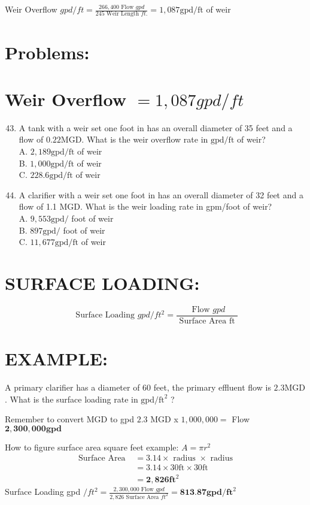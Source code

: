 \begin{enumerate}
Weir Overflow $g p d / f t=\frac{266,400 \text { Flow } g p d}{245 \text { Weir Length } f t .}=1,087 \mathrm{gpd} / \mathrm{ft}$ of weir

\section{Problems:}
\section{Weir Overflow $=1,087 g p d / f t$}
\begin{enumerate}
  \setcounter{enumi}{42}
  \item A tank with a weir set one foot in has an overall diameter of 35 feet and a flow of $0.22 \mathrm{MGD}$. What is the weir overflow rate in $\mathrm{gpd} / \mathrm{ft}$ of weir?\\
A. $2,189 \mathrm{gpd} / \mathrm{ft}$ of weir\\
B. $1,000 \mathrm{gpd} / \mathrm{ft}$ of weir\\
C. $228.6 \mathrm{gpd} / \mathrm{ft}$ of weir

  \item A clarifier with a weir set one foot in has an overall diameter of 32 feet and a flow of 1.1 MGD. What is the weir loading rate in gpm/foot of weir?\\
A. $9,553 \mathrm{gpd} /$ foot of weir\\
B. $897 \mathrm{gpd} /$ foot of weir\\
C. $11,677 \mathrm{gpd} / \mathrm{ft}$ of weir

\end{enumerate}
\section{SURFACE LOADING:}
$$
\text { Surface Loading } g p d / f t^{2}=\frac{\text { Flow } g p d}{\text { Surface Area ft }}
$$

\section{EXAMPLE:}
A primary clarifier has a diameter of 60 feet, the primary effluent flow is $2.3 \mathrm{MGD}$. What is the surface loading rate in $\mathrm{gpd} / \mathrm{ft}^{2}$ ?

Remember to convert MGD to gpd $2.3$ MGD x $1,000,000=$ Flow $\mathbf{2 , 3 0 0 , 0 0 0} \mathbf{g p d}$

How to figure surface area square feet example: $A=\pi r^{2}$
$$
\begin{aligned}
\text { Surface Area } &=3.14 \times \text { radius } \times \text { radius } \\
&=3.14 \times 30 \mathrm{ft} \times 30 \mathrm{ft} \\
&=\mathbf{2}, \mathbf{8 2 6} \mathbf{f t}^{2}
\end{aligned}
$$
Surface Loading gpd $/ f t^{2}=\frac{2,300,000 \text { Flow } g p d}{2,826 \text { Surface Area } f t^{2}}=\mathbf{8 1 3 . 8 7} \mathbf{g p d} / \mathbf{f t}^{2}$


\end{enumerate}

